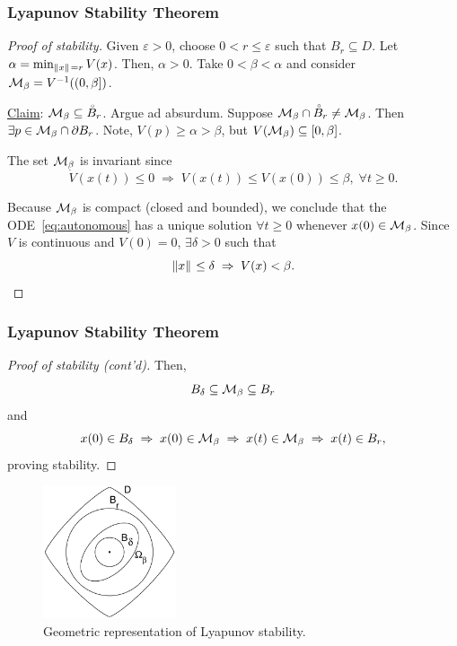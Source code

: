 \begin{frame}
    \frametitle{Lyapunov Stability Theorem}

    \begin{proof}[Proof of stability]
        Given $\varepsilon > 0$, choose $0 < r \leq \varepsilon$ such that $B_r
        \subseteq D$. Let $\alpha = \min_{\|{x}\|_{{}_{}}=r} V(x)$. Then, $\alpha >
        0$. Take $0 < \beta < \alpha$ and consider $\mathcal{M}_\beta = V^{-1}((0,
        \beta])$.

        \underline{Claim}: $\mathcal{M}_\beta \subseteq \accentset{\circ}{B}_r$.
        Argue ad absurdum. Suppose $\mathcal{M}_\beta \cap \accentset{\circ}{B}_r
        \neq \mathcal{M}_\beta$. Then $\exists p \in \mathcal{M}_\beta \cap \partial B_r$.
        Note, $V(p) \geq \alpha > \beta$, but $V(\mathcal{M}_\beta) \subseteq
        [0,\beta]$.

        The set $\mathcal{M}_\beta$ is invariant since \[ \dot{V}(x(t)) \leq 0 \;
        \Rightarrow \; V(x(t)) \leq V(x(0)) \leq \beta, \; \forall t \geq 0. \]

        Because $\mathcal{M}_\beta$ is compact (closed and bounded), we conclude that
        the ODE~\eqref{eq:autonomous} has a unique solution $\forall t \geq 0$
        whenever $x(0) \in \mathcal{M}_\beta$. Since $V$ is continuous and $V(0) =
        0$, $\exists \delta > 0$ such that \[ \|{x}\|_{{}_{}} \leq \delta \;
        \Rightarrow \; V(x) < \beta. \]
    \end{proof}
\end{frame}

\begin{frame}
    \frametitle{Lyapunov Stability Theorem}

    \begin{proof}[Proof of stability (cont'd)]
        Then, \[ B_\delta \subseteq \mathcal{M}_\beta \subseteq B_r \] and 
        \[ x(0) \in B_\delta \; \Rightarrow \; x(0) \in \mathcal{M}_\beta \;
        \Rightarrow \; x(t) \in \mathcal{M}_\beta \; \Rightarrow \; x(t) \in B_r, \]
        proving stability.
    \end{proof}

    \begin{figure}[bth]
        \centering
        \includegraphics[width=0.35\textwidth]{figures/lyap_geometry.png} 
        \caption{\footnotesize Geometric representation of Lyapunov stability.}
    \end{figure}
\end{frame}

